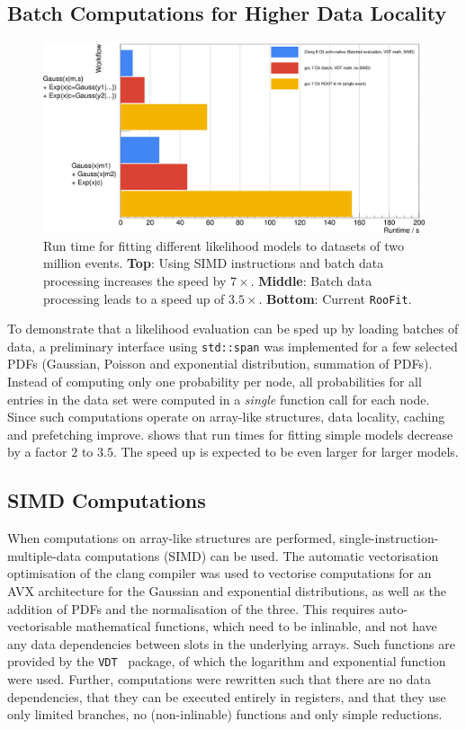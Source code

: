 \documentclass[a4paper]{jpconf}
\newcommand{\RooFit}{\texttt{RooFit}\xspace}
\begin{document}
\subsection{Batch Computations for Higher Data Locality}
\begin{figure}[t]
\begin{center}
\includegraphics[width=1.\linewidth]{batchAndVecSpeed.png}
\end{center}
\caption{\label{VecSpeed}Run time for fitting different likelihood models to datasets of two million events. \textbf{Top}: Using SIMD instructions and batch data processing increases the speed by $7{\times}$. \textbf{Middle}: Batch data processing leads to a speed up of $3.5{\times}.$ \textbf{Bottom}: Current \RooFit.}
\end{figure}

To demonstrate that a likelihood evaluation can be sped up by loading batches of data, a preliminary interface using \texttt{std::span} was
implemented for a few selected PDFs (Gaussian, Poisson and exponential distribution, summation of PDFs).
Instead of computing only one probability per node, all probabilities for all entries in the data set were
computed in a \textit{single} function call for each node. Since such computations operate on array-like structures, data locality, caching and prefetching improve.
 shows that run times for fitting simple models decrease by
a factor $2$ to $3.5$. The speed up is expected to be even larger for larger models.

\subsection{SIMD Computations}
When computations on array-like structures are performed, single-instruction-multiple-data computations (SIMD) can be used. The automatic
vectorisation optimisation of the clang compiler was used to vectorise computations for an AVX architecture for the Gaussian and exponential distributions, as well as the
addition of PDFs and the normalisation of the three. This requires auto-vectorisable mathematical functions, which need to be inlinable, and
not have any data dependencies between slots in the underlying arrays. Such functions are provided by the
\texttt{VDT}~\cite{VDT} package, of which the logarithm and exponential function were used. Further, computations were rewritten such
that there are no data dependencies, that they can be executed entirely in registers,
and that they use only limited branches, no (non-inlinable) functions and only simple reductions.
\end{document}
